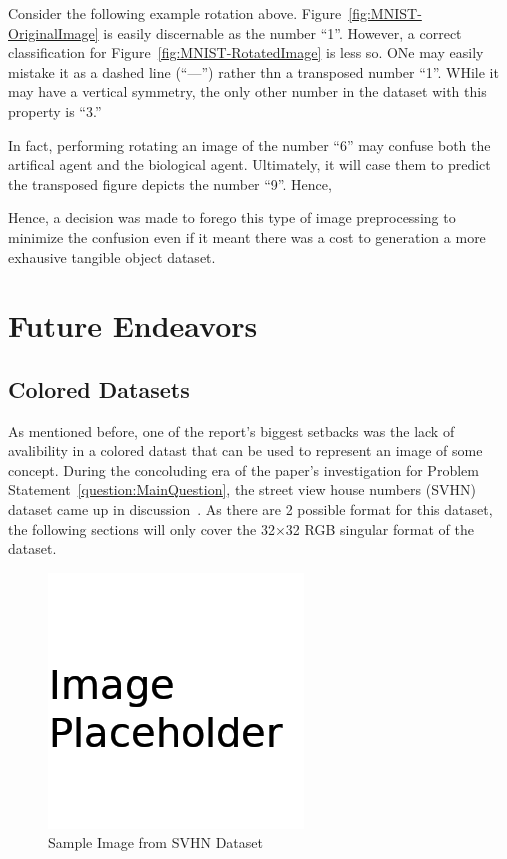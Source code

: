\documentclass[conference]{IEEEtran}
\begin{document}
Consider the following example rotation above.
Figure~\ref{fig:MNIST-OriginalImage} is easily discernable as the number ``1''.
However, a correct classification for Figure~\ref{fig:MNIST-RotatedImage} is
less so. ONe may easily mistake it as a dashed line (``---'') rather thn a
transposed number ``1''. WHile it may have a vertical symmetry, the only other
number in the dataset with this property is ``3.''

In fact, performing rotating an image of the number ``6'' may confuse
both the artifical agent and the biological agent. Ultimately, it will case them
to predict the transposed figure  depicts the number ``9''. Hence,

Hence, a decision was made to forego this type of image preprocessing  to
minimize the confusion  even if it meant there was a cost to generation a more
exhausive tangible object dataset.



\section{Future Endeavors} %


\subsection{Colored Datasets} %

As mentioned before, one of the report's biggest setbacks was the lack of
avalibility in a colored datast that can be used to represent an image of some
concept. During the concoluding era of the paper's investigation for Problem
Statement~\ref{question:MainQuestion}, the street view house numbers (SVHN)
dataset came up in discussion~\cite{stree_view_house_numbers_dataset}. As there
are 2 possible format for this dataset, the following sections will only cover
the 32$\times$32 RGB singular format of the dataset.


\begin{figure}[H]
  \centering
  \includegraphics[width=0.8\linewidth]{figures/placeholder.png}
  \caption{Sample Image from SVHN Dataset~\cite{stree_view_house_numbers_dataset}}%
  \label{fig:SVHN-SingularNumber}
\end{figure}
\end{document}

